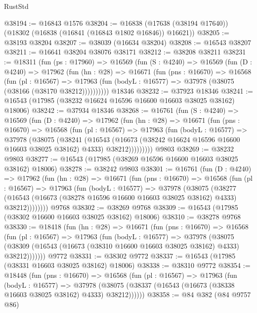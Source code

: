 \begin{lexlean}{RustStd}
\begin{coremodule}
@38194 := @16843 @1576
@38204 := @16838 (@17638 (@38194 @17640)) (@18302 (@16838 (@16841 (@16843 @1802 @16846)) @16621))
@38205 := @38193 @38204
@38207 := @38039 (@16634 @38204)
@38208 := @16543 @38207
@38211 := @16641 @38204 @38076 @38171
@38212 := @38208 @38211
@38231 := @18311
    (fun (ps : @17960) =>
    @16569
      (fun (S : @4240) =>
      @16569
        (fun (D : @4240) =>
        @17962
          (fun (hn : @28) =>
          @16671
            (fun (pns : @16670) =>
            @16568
              (fun (pl : @16567) =>
              @17963 (fun (bodyL : @16577) => @37978 (@38075 (@38166 (@38170 @38212))))))))))
    @18346
@38232 := @37923 @18346
@38241 := @16543 (@17985 (@38232 @16624 @16596 @16600 @16603 @38025 @38162) @18006)
@38242 := @37934 @18346
@38268 := @16761
    (fun (S : @4240) =>
    @16569
      (fun (D : @4240) =>
      @17962
        (fun (hn : @28) =>
        @16671
          (fun (pns : @16670) =>
          @16568
            (fun (pl : @16567) =>
            @17963
              (fun (bodyL : @16577) =>
              @37978
                (@38075
                  (@38241
                    (@16543
                      (@16673 (@38242 @16624 @16596 @16600 @16603 @38025 @38162) @4333)
                      @38212)))))))))
    @9803
@38269 := @38232 @9803
@38277 := @16543 (@17985 (@38269 @16596 @16600 @16603 @38025 @38162) @18006)
@38278 := @38242 @9803
@38301 := @16761
    (fun (D : @4240) =>
    @17962
      (fun (hn : @28) =>
      @16671
        (fun (pns : @16670) =>
        @16568
          (fun (pl : @16567) =>
          @17963
            (fun (bodyL : @16577) =>
            @37978
              (@38075
                (@38277
                  (@16543 (@16673 (@38278 @16596 @16600 @16603 @38025 @38162) @4333) @38212))))))))
    @9768
@38302 := @38269 @9768
@38309 := @16543 (@17985 (@38302 @16600 @16603 @38025 @38162) @18006)
@38310 := @38278 @9768
@38330 := @18418
    (fun (hn : @28) =>
    @16671
      (fun (pns : @16670) =>
      @16568
        (fun (pl : @16567) =>
        @17963
          (fun (bodyL : @16577) =>
          @37978
            (@38075
              (@38309 (@16543 (@16673 (@38310 @16600 @16603 @38025 @38162) @4333) @38212)))))))
    @9772
@38331 := @38302 @9772
@38337 := @16543 (@17985 (@38331 @16603 @38025 @38162) @18006)
@38338 := @38310 @9772
@38354 := @18448
    (fun (pns : @16670) =>
    @16568
      (fun (pl : @16567) =>
      @17963
        (fun (bodyL : @16577) =>
        @37978 (@38075 (@38337 (@16543 (@16673 (@38338 @16603 @38025 @38162) @4333) @38212))))))
@38358 := @84 @382 (@84 @9757 @86)

\end{coremodule}
\end{lexlean}
